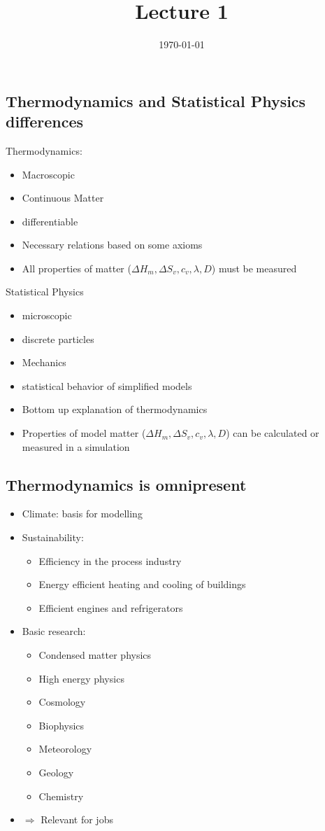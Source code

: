 \documentclass[]{scrartcl}
\title{Lecture 1}
\author{}
\date{\today}
\begin{document}
\maketitle
\newpage
\tableofcontents
\newpage

\subsection{Thermodynamics and Statistical Physics differences}
Thermodynamics:
\begin{itemize}
	\item Macroscopic
	\item Continuous Matter
	\item differentiable
	\item Necessary relations based on some axioms
	\item All properties of matter ($\Delta H_m, \Delta S_v, c_v, \lambda, D$) must be measured
\end{itemize}
Statistical Physics
\begin{itemize}
	\item microscopic
	\item discrete particles
	\item Mechanics
	\item statistical behavior of simplified models
	\item Bottom up explanation of thermodynamics
	\item Properties of model matter ($\Delta H_m, \Delta S_v, c_v, \lambda, D$) can be calculated or measured in a simulation
\end{itemize}

\subsection{Thermodynamics is omnipresent}
\begin{itemize}
	\item Climate: basis for modelling
	\item Sustainability:
	\begin{itemize}
		\item Efficiency in the process industry
		\item Energy efficient heating and cooling of buildings
		\item Efficient engines and refrigerators
	\end{itemize}
	\item Basic research:
	\begin{itemize}
		\item Condensed matter physics
		\item High energy physics
		\item Cosmology
		\item Biophysics
		\item Meteorology
		\item Geology
		\item Chemistry
	\end{itemize}
\item $\Rightarrow$ Relevant for jobs
\end{itemize}
\end{document}
